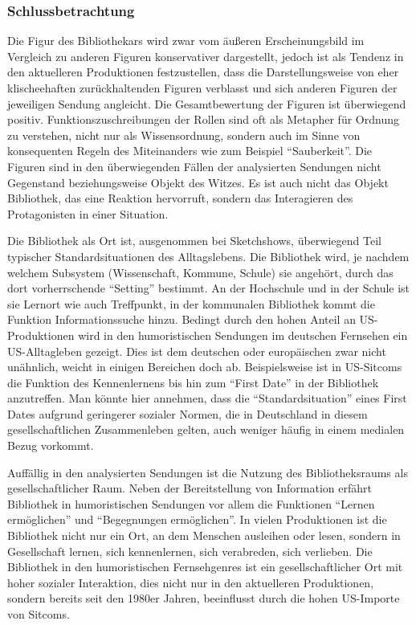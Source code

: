 \subsubsection{Schlussbetrachtung}\label{schlussbetrachtung}

Die Figur des Bibliothekars wird zwar vom äußeren Erscheinungsbild im
Vergleich zu anderen Figuren konservativer dargestellt, jedoch ist als
Tendenz in den aktuelleren Produktionen festzustellen, dass die
Darstellungsweise von eher klischeehaften zurückhaltenden Figuren
verblasst und sich anderen Figuren der jeweiligen Sendung angleicht. Die
Gesamtbewertung der Figuren ist überwiegend positiv.
Funktionszuschreibungen der Rollen sind oft als Metapher für Ordnung zu
verstehen, nicht nur als Wissensordnung, sondern auch im Sinne von
konsequenten Regeln des Miteinanders wie zum Beispiel
\enquote{Sauberkeit}. Die Figuren sind in den überwiegenden Fällen der
analysierten Sendungen nicht Gegenstand beziehungsweise Objekt des
Witzes. Es ist auch nicht das Objekt Bibliothek, das eine Reaktion
hervorruft, sondern das Interagieren des Protagonisten in einer
Situation.

Die Bibliothek als Ort ist, ausgenommen bei Sketchshows, überwiegend
Teil typischer Standardsituationen des Alltagslebens. Die Bibliothek
wird, je nachdem welchem Subsystem (Wissenschaft, Kommune, Schule) sie
angehört, durch das dort vorherrschende \enquote{Setting} bestimmt. An
der Hochschule und in der Schule ist sie Lernort wie auch Treffpunkt, in
der kommunalen Bibliothek kommt die Funktion Informationssuche hinzu.
Bedingt durch den hohen Anteil an US-Produktionen wird in den
humoristischen Sendungen im deutschen Fernsehen ein US-Alltagleben
gezeigt. Dies ist dem deutschen oder europäischen zwar nicht unähnlich,
weicht in einigen Bereichen doch ab. Beispielsweise ist in US-Sitcoms
die Funktion des Kennenlernens bis hin zum \enquote{First Date} in der
Bibliothek anzutreffen. Man könnte hier annehmen, dass die
\enquote{Standardsituation} eines First Dates aufgrund geringerer
sozialer Normen, die in Deutschland in diesem gesellschaftlichen
Zusammenleben gelten, auch weniger häufig in einem medialen Bezug
vorkommt.

Auffällig in den analysierten Sendungen ist die Nutzung des
Bibliotheksraums als gesellschaftlicher Raum. Neben der Bereitstellung
von Information erfährt Bibliothek in humoristischen Sendungen vor allem
die Funktionen \enquote{Lernen ermöglichen} und \enquote{Begegnungen
ermöglichen}. In vielen Produktionen ist die Bibliothek nicht nur ein
Ort, an dem Menschen ausleihen oder lesen, sondern in Gesellschaft
lernen, sich kennenlernen, sich verabreden, sich verlieben. Die
Bibliothek in den humoristischen Fernsehgenres ist ein
gesellschaftlicher Ort mit hoher sozialer Interaktion, dies nicht nur in
den aktuelleren Produktionen, sondern bereits seit den 1980er Jahren,
beeinflusst durch die hohen US-Importe von Sitcoms.

